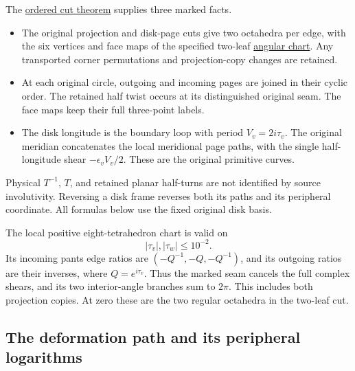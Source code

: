 The \hyperref[sec:ft]{ordered cut theorem} supplies three marked facts.

\begin{itemize}
\item
  The original projection and disk-page cuts give two octahedra per edge, with the six vertices and face maps of the specified two-leaf \hyperref[sec:fa]{angular chart}. Any transported corner permutations and projection-copy changes are retained.
\item
  At each original circle, outgoing and incoming pages are joined in their cyclic order. The retained half twist occurs at its distinguished original seam. The face maps keep their full three-point labels.
\item
  The disk longitude is the boundary loop with period \(V_v=2i\tau_v\). The original meridian concatenates the local meridional page paths, with the single half-longitude shear \(-\epsilon_vV_v/2\). These are the original primitive curves.
\end{itemize}

Physical \(T^{-1}\), \(T\), and retained planar half-turns are not identified by source involutivity. Reversing a disk frame reverses both its paths and its peripheral coordinate. All formulas below use the fixed original disk basis.

The local positive eight-tetrahedron chart is valid on
\begin{equation}
|\tau_v|,|\tau_w|\le10^{-2}.
\label{eq:fg-1}
\end{equation}
Its incoming pants edge ratios are \((-Q^{-1},-Q,-Q^{-1})\), and its outgoing ratios are their inverses, where \(Q=e^{i\tau_v}\). Thus the marked seam cancels the full complex shears, and its two interior-angle branches sum to \(2\pi\). This includes both projection copies. At zero these are the two regular octahedra in the two-leaf cut.

\subsection{The deformation path and its peripheral logarithms}\label{sec:fg-2}

